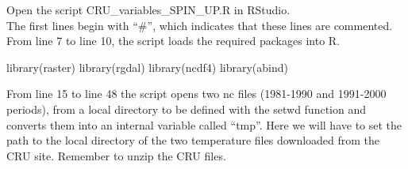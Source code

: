 \documentclass[
  10pt,
  b5paper,
]{book}
\newenvironment{Shaded}{\begin{snugshade}}{\end{snugshade}}
\newcommand{\FunctionTok}[1]{\textcolor[rgb]{0.00,0.00,0.00}{#1}}
\newcommand{\NormalTok}[1]{#1}
\begin{document}
Open the script CRU\_variables\_SPIN\_UP.R in RStudio.\\
The first lines begin with ``\#'', which indicates that these lines are commented. From line 7 to line 10, the script loads the required packages into R.

\begin{Shaded}
\begin{Highlighting}[]
\FunctionTok{library}\NormalTok{(raster)}
\FunctionTok{library}\NormalTok{(rgdal)}
\FunctionTok{library}\NormalTok{(ncdf4)}
\FunctionTok{library}\NormalTok{(abind)}
\end{Highlighting}
\end{Shaded}

From line 15 to line 48 the script opens two nc files (1981-1990 and 1991-2000 periods), from a local directory to be defined with the setwd function and converts them into an internal variable called ``tmp''. Here we will have to set the path to the local directory of the two temperature files downloaded from the CRU site. Remember to unzip the CRU files.
\end{document}
